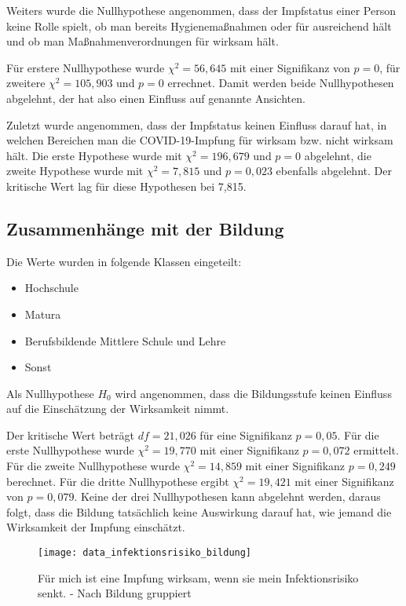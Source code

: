 Weiters wurde die Nullhypothese angenommen, dass der Impfstatus einer Person keine Rolle spielt, ob man bereits Hygienemaßnahmen oder für ausreichend hält und ob man Maßnahmenverordnungen für wirksam hält.

Für erstere Nullhypothese wurde \(\chi^2 = 56,645\) mit einer Signifikanz von \(p = 0\), für zweitere \(\chi^2 = 105,903\) und \(p = 0\) errechnet. Damit werden beide Nullhypothesen abgelehnt, der hat also einen Einfluss auf genannte Ansichten.

Zuletzt wurde angenommen, dass der Impfstatus keinen Einfluss darauf hat, in welchen Bereichen man die COVID-19-Impfung für wirksam bzw. nicht wirksam hält. Die erste Hypothese wurde mit \(\chi^2 = 196,679\) und \(p = 0\) abgelehnt, die zweite Hypothese wurde mit \(\chi^2 = 7,815\) und \(p = 0,023\) ebenfalls abgelehnt. Der kritische Wert lag für diese Hypothesen bei 7,815.

\subsection{Zusammenhänge mit der Bildung}

Die Werte wurden in folgende Klassen eingeteilt:
\begin{itemize}
    \item Hochschule
    \item Matura
    \item Berufsbildende Mittlere Schule und Lehre
    \item Sonst
\end{itemize}

Als Nullhypothese \(H_0\) wird angenommen, dass die Bildungsstufe keinen Einfluss auf die Einschätzung der Wirksamkeit nimmt.

Der kritische Wert beträgt \(df = 21,026\) für eine Signifikanz \(p = 0,05\).
Für die erste Nullhypothese wurde \(\chi^2 = 19,770\) mit einer Signifikanz \(p = 0,072\) ermittelt. Für die zweite Nullhypothese wurde \(\chi^2 = 14,859\) mit einer Signifikanz \(p = 0,249\) berechnet. Für die dritte Nullhypothese ergibt \(\chi^2 = 19,421\) mit einer Signifikanz von \(p = 0,079\). Keine der drei Nullhypothesen kann abgelehnt werden, daraus folgt, dass die Bildung tatsächlich keine Auswirkung darauf hat, wie jemand die Wirksamkeit der Impfung einschätzt.

\begin{figure}[ht]
    \caption{Für mich ist eine Impfung wirksam, wenn sie mein Infektionsrisiko senkt. - Nach Bildung gruppiert}
    \label{fig:vgl_infektionsrisiko_bildung}
    \centering
    \texttt{[image: data\_infektionsrisiko\_bildung]}
\end{figure}

